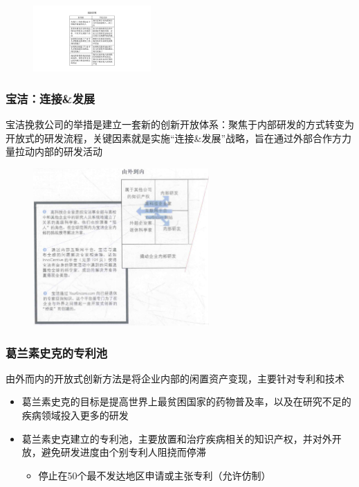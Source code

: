     \begin{figure}[H]
		\centering
        \vspace{-0.5em}
		\includegraphics[width=0.4\textwidth]{img/创新原则.pdf}
        \vspace{-0.5em}
	\end{figure}

    \subsubsection{宝洁：连接\&发展}
    宝洁挽救公司的举措是建立一套新的创新开放体系：聚焦于内部研发的方式转变为开放式的研发流程，关键因素就是实施“连接\&发展”战略，旨在通过外部合作方力量拉动内部的研发活动
    \begin{figure}[H]
		\centering
        \vspace{-0.5em}
		\includegraphics[width=0.6\textwidth]{img/宝洁.png}
        \vspace{-0.5em}
	\end{figure}

    \subsubsection{葛兰素史克的专利池}
    由外而内的开放式创新方法是将企业内部的闲置资产变现，主要针对专利和技术
    \begin{itemize}
        \item 葛兰素史克的目标是提高世界上最贫困国家的药物普及率，以及在研究不足的疾病领域投入更多的研发
        \item 葛兰素史克建立的专利池，主要放置和治疗疾病相关的知识产权，并对外开放，避免研发进度由个别专利人阻挠而停滞
        \begin{itemize}
            \item 停止在50个最不发达地区申请或主张专利（允许仿制）
        \end{itemize}
    \end{itemize}
    
